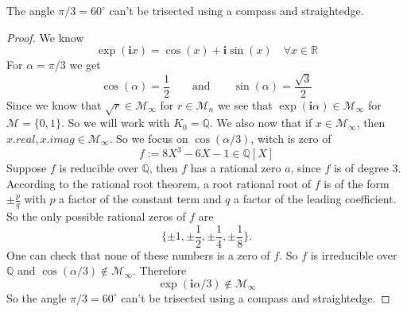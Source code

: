 \begin{theorem}
    The angle $\pi / 3 = 60^{\circ}$ can't be trisected using a compass and straightedge.
\end{theorem}
\begin{proof}
    We know
    \begin{equation*}
        \exp(\textbf{i}x) = \cos(x) + \textbf{i} \sin(x) \quad \forall x \in \mathbb{R}
    \end{equation*}
    For $\alpha = \pi / 3$ we get
    \begin{equation*}
        \cos(\alpha) = \frac{1}{2}\qquad \text{and}\qquad \sin(\alpha) = \frac{\sqrt{3}}{2}
    \end{equation*}
    Since we know that $\sqrt{r} \in \mathcal{M}_{\infty}$ for $r \in \mathcal{M}_n$
    we see that $\exp(\textbf{i} \alpha) \in \mathcal{M}_{\infty}$ for $\mathcal{M} = \{0,1\}$. \newline
    So we will work with $K_0 = \mathbb{Q}$. \newline
    We also now that if $x\in \mathcal{M}_{\infty}$, then $x.real, x.imag \in \mathcal{M}_{\infty}$. So we focus on $\cos(\alpha/3)$, witch is zero of
    \begin{equation*}
        f := 8 X^3 - 6 X - 1 \in \mathbb{Q}[X]
    \end{equation*}
    Suppose $f$ is reducible over $\mathbb{Q}$, then $f$ has a rational zero $a$, since $f$ is of degree $3$. According to the rational root theorem, a root rational root of $f$ is of the form $\pm \frac{p}{q}$ with $p$ a factor of the constant term and $q$ a factor of the leading coefficient. So the only possible rational zeros of $f$ are
     \begin{equation*}
        \{ \pm 1, \pm \frac{1}{2}, \pm \frac{1}{4}, \pm \frac{1}{8} \}.
     \end{equation*}
     One can check that none of these numbers is a zero of $f$.
     So $f$ is irreducible over $\mathbb{Q}$ and $\cos(\alpha/3) \notin \mathcal{M}_{\infty}$.
     Therefore
        \begin{equation*}
            \exp(\textbf{i} \alpha/3) \notin \mathcal{M}_{\infty}
        \end{equation*}
    So the angle $\pi / 3 = 60^{\circ}$ can't be trisected using a compass and straightedge.
\end{proof}
